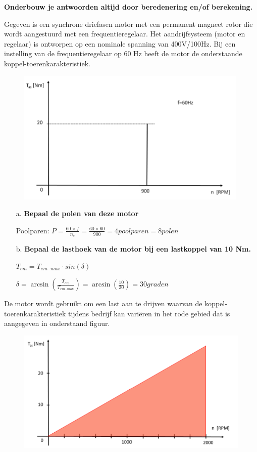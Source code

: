 \textbf{Onderbouw je antwoorden altijd door beredenering en/of berekening.}

Gegeven is een synchrone driefasen motor met een permanent magneet rotor die wordt aangestuurd met een frequentieregelaar. Het aandrijfsysteem (motor en regelaar) is ontworpen op een nominale spanning van 400V/100Hz. Bij een instelling van de frequentieregelaar op 60 Hz heeft de motor de onderstaande
koppel-toerenkarakteristiek.

\begin{figure}[h]
    \centering
    \includegraphics[scale=1.5]{3-uitleg.png}
\end{figure}

\begin{enumerate}
    \item [a.] \textbf{Bepaal de polen van deze motor}
    
        Poolparen:
        $ P = \frac{60 \times f}{n_{s}} = \frac{60 \times 60}{900} = 4 poolparen = 8 polen$

    \item [b.] \textbf{Bepaal de lasthoek van de motor bij een lastkoppel van 10 Nm.}

        $T_{em} = T_{em \cdot max} \cdot sin(\delta)$

        $\delta 
        = \arcsin \left( \frac{T_{em}}{T_{em \cdot \text{max}}} \right) 
        = \arcsin \left( \frac{10}{20} \right)
        = 30 graden $

\end{enumerate}

De motor wordt gebruikt om een last aan te drijven waarvan de koppel-toerenkarakteristiek tijdens bedrijf kan variëren in het rode gebied dat is aangegeven in onderstaand figuur.
\begin{figure}[h]
    \centering
    \includegraphics[scale=1]{3b-uitleg.png}
\end{figure}

